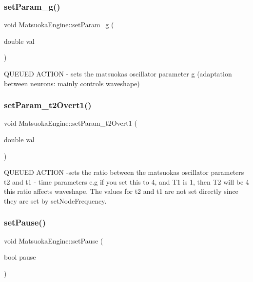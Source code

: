 \mbox{\label{classMatsuokaEngine_aba4ab083a57717c7dba5d75ff3d1987a}} 
\subsubsection{\texorpdfstring{set\+Param\+\_\+g()}{setParam\_g()}}
{\footnotesize\ttfamily void Matsuoka\+Engine\+::set\+Param\+\_\+g (\begin{DoxyParamCaption}\item[{double}]{val }\end{DoxyParamCaption})}



Q\+U\+E\+U\+ED A\+C\+T\+I\+ON -\/ sets the matsuoka\textquotesingle{}s oscillator parameter g (adaptation between neurons\+: mainly controls waveshape) 

\mbox{\label{classMatsuokaEngine_a22a2a27ba2ad7f8ea7a4121326ac8a21}} 
\subsubsection{\texorpdfstring{set\+Param\+\_\+t2\+Overt1()}{setParam\_t2Overt1()}}
{\footnotesize\ttfamily void Matsuoka\+Engine\+::set\+Param\+\_\+t2\+Overt1 (\begin{DoxyParamCaption}\item[{double}]{val }\end{DoxyParamCaption})}

Q\+U\+E\+U\+ED A\+C\+T\+I\+ON -\/sets the ratio between the matsuoka\textquotesingle{}s oscillator parameters t2 and t1 -\/ time parameters e.\+g if you set this to 4, and T1 is 1, then T2 will be 4 this ratio affects waveshape. The values for t2 and t1 are not set directly since they are set by set\+Node\+Frequency. \mbox{\label{classMatsuokaEngine_a929ade3a9ce6497e47183190255cbfae}} 
\subsubsection{\texorpdfstring{set\+Pause()}{setPause()}}
{\footnotesize\ttfamily void Matsuoka\+Engine\+::set\+Pause (\begin{DoxyParamCaption}\item[{bool}]{pause }\end{DoxyParamCaption})}



